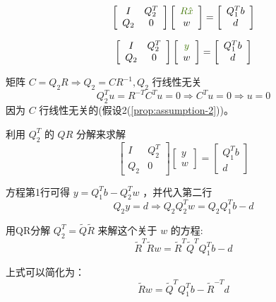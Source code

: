 $$\displaystyle \left[\begin{array}{ c c }
    I & Q_{2}^{T}\\
    Q_{2} & 0
    \end{array}\right]\left[\begin{array}{ c }
    \textcolor[rgb]{0.25,0.46,0.02}{R\hat{x}}\\
    w
    \end{array}\right] =\left[\begin{array}{ c }
    Q_{1}^{T} b\\
    d
    \end{array}\right]$$

$$\displaystyle \left[\begin{array}{ c c }
    I & Q_{2}^{T}\\
    Q_{2} & 0
    \end{array}\right]\left[\begin{array}{ c }
    \textcolor[rgb]{0.25,0.46,0.02}{y}\\
    w
    \end{array}\right] =\left[\begin{array}{ c }
    Q_{1}^{T} b\\
    d
    \end{array}\right]$$


矩阵 $ C=Q_{2} R \Rightarrow Q_{2}=C R^{-1}, Q_{2} $ 行线性无关
$$
Q_{2}^{T} u=R^{-T} C^{T} u=0  \Rightarrow  C^{T} u=0 \Rightarrow  u=0
$$
因为 $ C $ 行线性无关的(假设2(\ref{prop:assumption-2}))。

利用 $ Q_{2}^{T} $ 的 $ Q R $ 分解来求解
$$
\left[\begin{array}{cc}
I & Q_{2}^{T} \\
Q_{2} & 0
\end{array}\right]\left[\begin{array}{l}
y \\
w
\end{array}\right]=\left[\begin{array}{c}
Q_{1}^{T} b \\
d
\end{array}\right]
$$

方程第1行可得 $ y=Q_{1}^{T} b-Q_{2}^{T} w $ ，并代入第二行
$$
Q_{2} y=d \Rightarrow Q_{2} Q_{2}^{T} w=Q_{2} Q_{1}^{T} b-d
$$

用QR分解 $ Q_{2}^{T}=\tilde{Q} \tilde{R} $ 来解这个关于 $ w $ 的方程:
$$
\tilde{R}^{T} \tilde{R} w=\tilde{R}^{T} \tilde{Q}^{T} Q_{1}^{T} b-d
$$

上式可以简化为：
$$
\tilde{R} w=\tilde{Q}^{T} Q_{1}^{T} b-\tilde{R}^{-T} d
$$

